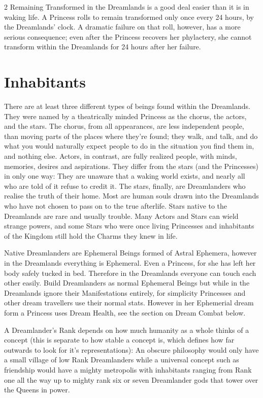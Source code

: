 \begin{multicols}{2}
Remaining Transformed in the Dreamlands is a good deal easier than it is in waking life. A Princess rolls to remain transformed only once every 24 hours, by the Dreamlands' clock. A dramatic failure on that roll, however, has a more serious consequence; even after the Princess recovers her phylactery, she cannot transform within the Dreamlands for 24 hours after her failure.

\section*{Inhabitants}

There are at least three different types of beings found within the Dreamlands.  They were named by a theatrically minded Princess as the chorus, the actors, and the stars.  The chorus, from all appearances, are less independent people, than moving parts of the places where they're found; they walk, and talk, and do what you would naturally expect people to do in the situation you find them in, and nothing else.  Actors, in contrast, are fully realized people, with minds, memories, desires and aspirations.  They differ from the stars (and the Princesses) in only one way: They are unaware that a waking world exists, and nearly all who are told of it refuse to credit it. The stars, finally, are Dreamlanders who realise the truth of their home. Most are human souls drawn into the Dreamlands who have not chosen to pass on to the true afterlife. Stars native to the Dreamlands are rare and usually trouble.  Many Actors and Stars can wield strange powers, and some Stars who were once living Princesses and inhabitants of the 
Kingdom still hold the Charms they knew in life.

Native Dreamlanders are Ephemeral Beings formed of Astral Ephemera, however in the Dreamlands everything is Ephemeral. Even a Princess, for she has left her body safely tucked in bed. Therefore in the Dreamlands everyone can touch each other easily. Build Dreamlanders as normal Ephemeral Beings but while in the Dreamlands ignore their Manifestations entirely, for simplicity Princesses and other dream travellers use their normal stats. However in her Ephemerial dream form a Princess uses Dream Health, see the section on Dream Combat below. 

A Dreamlander's Rank depends on how much humanity as a whole thinks of a concept (this is separate to how stable a concept is, which defines how far outwards to look for it's representations): An obscure philosophy would only have a small village of low Rank Dreamlanders while a universal concept such as friendship would have a mighty metropolis with inhabitants ranging from Rank one all the way up to mighty rank six or seven Dreamlander gods that tower over the Queens in power. 


\end{multicols}
